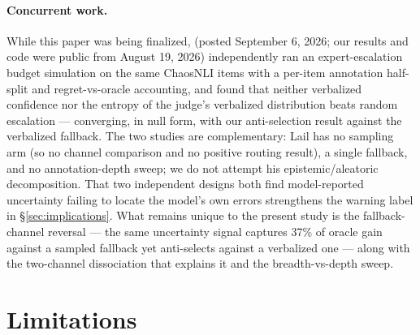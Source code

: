 \documentclass[11pt]{article}
\begin{document}
\paragraph{Concurrent work.} While this paper was being finalized, \citet{lail2026decomposing} (posted September 6, 2026; our results and code were public from August 19, 2026) independently ran an expert-escalation budget simulation on the same ChaosNLI items with a per-item annotation half-split and regret-vs-oracle accounting, and found that neither verbalized confidence nor the entropy of the judge's verbalized distribution beats random escalation --- converging, in null form, with our anti-selection result against the verbalized fallback. The two studies are complementary: Lail has no sampling arm (so no channel comparison and no positive routing result), a single fallback, and no annotation-depth sweep; we do not attempt his epistemic/aleatoric decomposition. That two independent designs both find model-reported uncertainty failing to locate the model's own errors strengthens the warning label in \S\ref{sec:implications}. What remains unique to the present study is the fallback-channel reversal --- the same uncertainty signal captures 37\% of oracle gain against a sampled fallback yet anti-selects against a verbalized one --- along with the two-channel dissociation that explains it and the breadth-vs-depth sweep.

\section{Limitations}
\label{sec:limitations}
\end{document}
